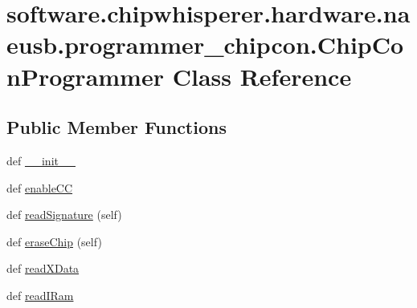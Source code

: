 \hypertarget{classsoftware_1_1chipwhisperer_1_1hardware_1_1naeusb_1_1programmer__chipcon_1_1ChipConProgrammer}{}\section{software.\+chipwhisperer.\+hardware.\+naeusb.\+programmer\+\_\+chipcon.\+Chip\+Con\+Programmer Class Reference}
\label{classsoftware_1_1chipwhisperer_1_1hardware_1_1naeusb_1_1programmer__chipcon_1_1ChipConProgrammer}
\subsection*{Public Member Functions}
\begin{DoxyCompactItemize}
\item 
def \hyperlink{classsoftware_1_1chipwhisperer_1_1hardware_1_1naeusb_1_1programmer__chipcon_1_1ChipConProgrammer_a1d389e1d56041382865f7490bc3aa86d}{\+\_\+\+\_\+init\+\_\+\+\_\+}
\item 
def \hyperlink{classsoftware_1_1chipwhisperer_1_1hardware_1_1naeusb_1_1programmer__chipcon_1_1ChipConProgrammer_a2ff6e75bafdb46c3484d5936103da2bf}{enable\+C\+C}
\item 
def \hyperlink{classsoftware_1_1chipwhisperer_1_1hardware_1_1naeusb_1_1programmer__chipcon_1_1ChipConProgrammer_a3e17953881cec0966d911c3f9efa2d78}{read\+Signature} (self)
\item 
def \hyperlink{classsoftware_1_1chipwhisperer_1_1hardware_1_1naeusb_1_1programmer__chipcon_1_1ChipConProgrammer_a02da83eb9a77a794a979f2420ddf7baa}{erase\+Chip} (self)
\item 
def \hyperlink{classsoftware_1_1chipwhisperer_1_1hardware_1_1naeusb_1_1programmer__chipcon_1_1ChipConProgrammer_a9e8d0ed6ff9d1b4d16fdef494653fae1}{read\+X\+Data}
\item 
def \hyperlink{classsoftware_1_1chipwhisperer_1_1hardware_1_1naeusb_1_1programmer__chipcon_1_1ChipConProgrammer_a25060d60371b1a853f3561e3d79211a9}{read\+I\+Ram}
\end{DoxyCompactItemize}
